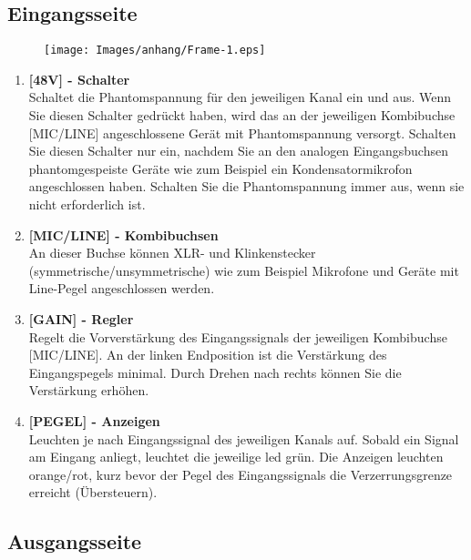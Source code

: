 \pagebreak
\subsection{Eingangsseite}
    \begin{figure}[H]
        \centering
        \texttt{[image: Images/anhang/Frame-1.eps]}
        \caption*{}
    \end{figure}
\begin{multicols}{2}
    \begin{enumerate}
        \item[\ding{202}] \textbf{[48V] - Schalter}    \\
            Schaltet die Phantomspannung für den jeweiligen Kanal ein und aus. Wenn Sie diesen Schalter gedrückt haben, wird das an der jeweiligen Kombibuchse [MIC/LINE] angeschlossene Gerät mit Phantomspannung versorgt. Schalten Sie diesen Schalter nur ein, nachdem Sie an den analogen Eingangsbuchsen phantomgespeiste Geräte wie zum Beispiel ein Kondensatormikrofon angeschlossen haben. Schalten Sie die Phantomspannung immer aus, wenn sie nicht erforderlich ist.
        \item[\ding{203}] \textbf{[MIC/LINE] - Kombibuchsen}    \\
            An dieser Buchse können XLR- und Klinkenstecker (symmetrische/unsymmetrische) wie zum Beispiel Mikrofone und Geräte mit Line-Pegel angeschlossen werden. 
        \item[\ding{204}] \textbf{[GAIN] - Regler}    \\
            Regelt die Vorverstärkung des Eingangssignals der jeweiligen Kombibuchse [MIC/LINE]. 
            An der linken Endposition ist die Verstärkung des Eingangspegels minimal. 
            Durch Drehen nach rechts können Sie die Verstärkung erhöhen.
        \item[\ding{205}] \textbf{[PEGEL] - Anzeigen}    \\
            Leuchten je nach Eingangssignal des jeweiligen Kanals auf. 
            Sobald ein Signal am Eingang anliegt, leuchtet die jeweilige \ac{led} grün.
            Die Anzeigen leuchten orange/rot, kurz bevor der Pegel des Eingangssignals die Verzerrungsgrenze erreicht (Übersteuern).
    \end{enumerate}
\end{multicols}

\pagebreak
\subsection{Ausgangsseite}


